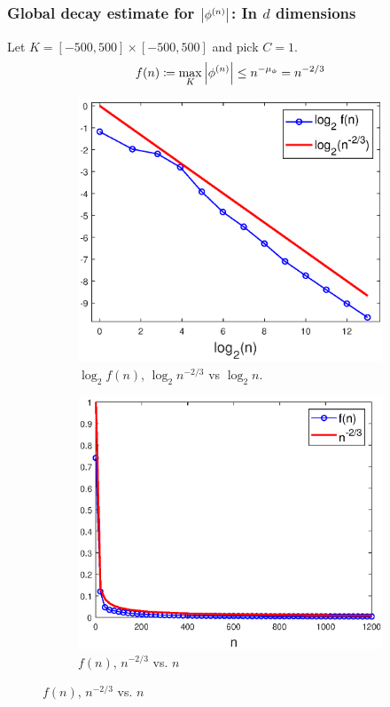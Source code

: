 \documentclass{beamer}
\theoremstyle{definition}
\begin{document}
\begin{frame}
\frametitle{Global decay estimate for $\abs{\phi^{(n)}}$: In $d$ dimensions}

Let $K = [-500,500]\times[-500,500]$ and pick $C=1$.  
\begin{equation*}
f(n)\coloneqq\max_{K}\abs{\phi^{(n)}}\leq n^{-\mu_\phi}= n^{-2/3}
\end{equation*}
\begin{figure}[!htb]
\vspace{-10pt}
\begin{subfigure}{0.49\textwidth}
\centering
\includegraphics[width=\textwidth]{Fig9a.eps}
\caption{$\log_2 f(n)$, $\log_2 n^{-2/3}$ vs $\log_2 n$.}
\end{subfigure}
\begin{subfigure}{0.49\textwidth}
\centering
\includegraphics[width=\textwidth]{Fig9b.eps}
\caption{$f(n)$, $n^{-2/3}$ vs. $n$}
\end{subfigure}
\label{fig:Conv_Pwr_3}
\end{figure}

\end{frame}
\end{document}
